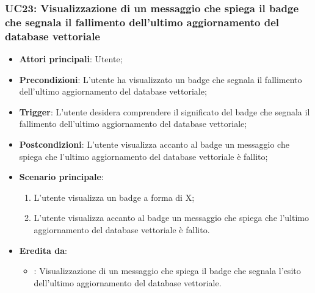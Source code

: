 \subsubsection{UC23: Visualizzazione di un messaggio che spiega il badge che segnala il fallimento dell'ultimo aggiornamento del database vettoriale}
\begin{itemize}
    \item \textbf{Attori principali}: Utente;
    \item \textbf{Precondizioni}: L'utente ha visualizzato un badge che segnala il fallimento dell'ultimo aggiornamento del database vettoriale;
    \item \textbf{Trigger}: L'utente desidera comprendere il significato del badge che segnala il fallimento dell'ultimo aggiornamento del database vettoriale;
    \item \textbf{Postcondizioni}: L'utente visualizza accanto al badge un messaggio che spiega che l'ultimo aggiornamento del database vettoriale è fallito;
    \item \textbf{Scenario principale}:
    \begin{enumerate}
        \item L'utente visualizza un badge a forma di X;
        \item L'utente visualizza accanto al badge un messaggio che spiega che l'ultimo aggiornamento del database vettoriale è fallito.
    \end{enumerate}
    \item \textbf{Eredita da}:
    \begin{itemize}
        \item {}: Visualizzazione di un messaggio che spiega il badge che segnala l'esito dell'ultimo aggiornamento del database vettoriale.
    \end{itemize}
\end{itemize}

\hypertarget{UC24}{}
